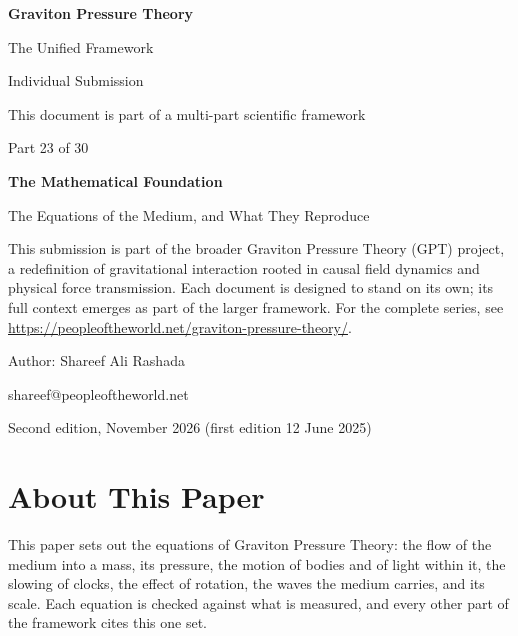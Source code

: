 \documentclass[11pt,a4paper]{article}
\begin{document}
\renewcommand{\thetable}{23.\arabic{table}}
\begin{titlepage}
\centering
\vspace*{1.5cm}
{\Huge\bfseries Graviton Pressure Theory\par}
\vspace{0.4cm}
{\Large The Unified Framework\par}
{\large Individual Submission\par}
\vspace{0.3cm}
{\normalsize This document is part of a multi-part scientific framework\par}
\vspace{1.6cm}
{\large Part 23 of 30\par}
\vspace{0.6cm}
{\huge\bfseries The Mathematical Foundation\par}
\vspace{0.5cm}
{\Large The Equations of the Medium, and What They Reproduce\par}
\vspace{1.4cm}
\begin{minipage}{0.82\textwidth}\centering\small
This submission is part of the broader Graviton Pressure Theory (GPT) project, a redefinition of gravitational interaction rooted in causal field dynamics and physical force transmission. Each document is designed to stand on its own; its full context emerges as part of the larger framework. For the complete series, see \url{https://peopleoftheworld.net/graviton-pressure-theory/}.
\end{minipage}
\vfill
{\large Author: Shareef Ali Rashada\par}
{\normalsize shareef@peopleoftheworld.net\par}
\vspace{0.3cm}
{\normalsize Second edition, November 2026 \quad (first edition 12 June 2025)\par}
\end{titlepage}

\tableofcontents
\newpage

\section*{About This Paper}

This paper sets out the equations of Graviton Pressure Theory: the flow of the medium into a mass, its pressure, the motion of bodies and of light within it, the slowing of clocks, the effect of rotation, the waves the medium carries, and its scale. Each equation is checked against what is measured, and every other part of the framework cites this one set.
\end{document}

